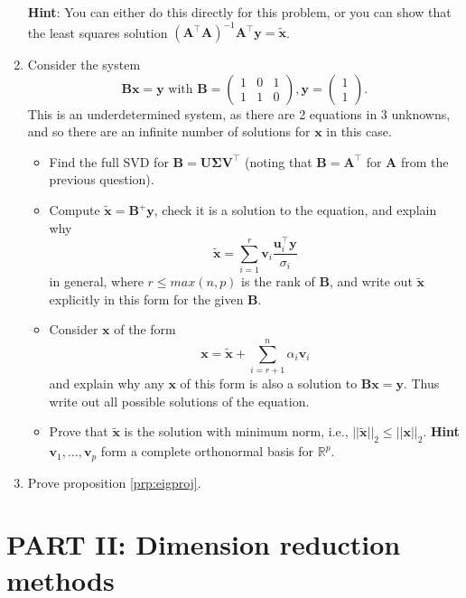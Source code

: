 \documentclass[]{book}
\providecommand{\tightlist}{%
  \setlength{\itemsep}{0pt}\setlength{\parskip}{0pt}}
\theoremstyle{definition}
\theoremstyle{definition}
\theoremstyle{definition}
\theoremstyle{remark}
\begin{document}
\begin{enumerate}
  \textbf{Hint}: You can either do this directly for this problem, or you can show that the least squares solution \((\mathbf A^\top \mathbf A)^{-1}\mathbf A^\top \mathbf y=\tilde{\mathbf x}\).
\item
  Consider the system
  \[\mathbf B\mathbf x= \mathbf y\mbox{ with }\mathbf B=\left(\begin{array}{ccc}1&0&1\\1&1&0\end{array}
  \right),\mathbf y= \left(\begin{array}{c}1\\1\end{array}
  \right).\]
  This is an underdetermined system, as there are 2 equations in 3 unknowns, and so there are an infinite number of solutions for \(\mathbf x\) in this case.

  \begin{itemize}
  \tightlist
  \item
    Find the full SVD for \(\mathbf B=\mathbf U\boldsymbol{\Sigma}\mathbf V^\top\) (noting that \(\mathbf B=\mathbf A^\top\) for \(\mathbf A\) from the previous question).
  \item
    Compute
    \(\tilde{\mathbf x}=\mathbf B^+\mathbf y\), check it is a solution to the equation, and explain why \[\tilde{\mathbf x}= \sum_{i=1}^r \mathbf v_i \frac{\mathbf u_i^\top \mathbf y}{\sigma_i}\] in general, where \(r\leq max(n,p)\) is the rank of \(\mathbf B\), and write out \(\tilde{\mathbf x}\) explicitly in this form for the given \(\mathbf B\).
  \item
    Consider \(\mathbf x\) of the form
    \[\mathbf x= \tilde{\mathbf x} + \sum_{i=r+1}^n \alpha_i \mathbf v_i\]
    and explain why any \(\mathbf x\) of this form is also a solution to \(\mathbf B\mathbf x=\mathbf y\). Thus write out all possible solutions of the equation.
  \item
    Prove that \(\tilde{\mathbf x}\) is the solution with minimum norm, i.e., \(||\tilde{\mathbf x}||_2 \leq ||\mathbf x||_2\). \textbf{Hint} \(\mathbf v_1, \ldots, \mathbf v_p\) form a complete orthonormal basis for \(\mathbb{R}^p\).
  \end{itemize}
\item
  Prove proposition \ref{prp:eigproj}.
\end{enumerate}

\hypertarget{part-ii-dimension-reduction-methods}{%
\chapter*{PART II: Dimension reduction methods}\label{part-ii-dimension-reduction-methods}}
\end{document}
